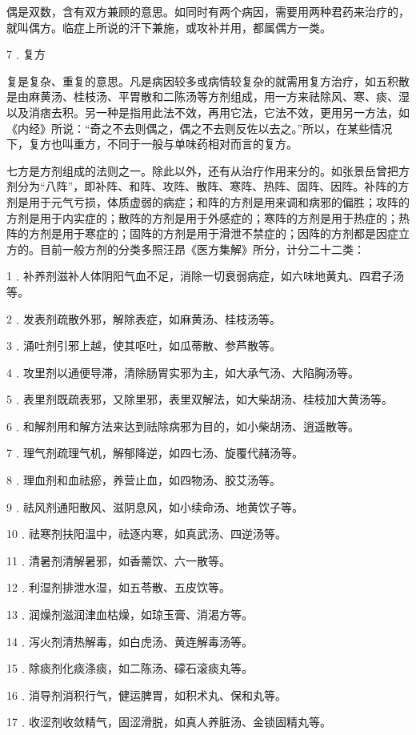 \documentclass[a4paper,12pt,UTF8,twoside]{ctexbook}
\begin{document}
偶是双数，含有双方兼顾的意思。如同时有两个病因，需要用两种君药来治疗的，就叫偶方。临症上所说的汗下兼施，或攻补并用，都属偶方一类。

7﹒复方

复是复杂、重复的意思。凡是病因较多或病情较复杂的就需用复方治疗，如五积散是由麻黄汤、桂枝汤、平胃散和二陈汤等方剂组成，用一方来祛除风、寒、痰、湿以及消痞去积。另一种是指用此法不效，再用它法，它法不效，更用另一方法，如《内经》所说：“奇之不去则偶之，偶之不去则反佐以去之。”所以，在某些情况下，复方也叫重方，不同于一般与单味药相对而言的复方。

七方是方剂组成的法则之一。除此以外，还有从治疗作用来分的。如张景岳曾把方剂分为“八阵”，即补阵、和阵、攻阵、散阵、寒阵、热阵、固阵、因阵。补阵的方剂是用于元气亏损，体质虚弱的病症；和阵的方剂是用来调和病邪的偏胜；攻阵的方剂是用于内实症的；散阵的方剂是用于外感症的；寒阵的方剂是用于热症的；热阵的方剂是用于寒症的；固阵的方剂是用于滑泄不禁症的；因阵的方剂都是因症立方的。目前一般方剂的分类多照汪昂《医方集解》所分，计分二十二类：

1﹒补养剂滋补人体阴阳气血不足，消除一切衰弱病症，如六味地黄丸、四君子汤等。

2﹒发表剂疏散外邪，解除表症，如麻黄汤、桂枝汤等。

3﹒涌吐剂引邪上越，使其呕吐，如瓜蒂散、参芦散等。

4﹒攻里剂以通便导滞，清除肠胃实邪为主，如大承气汤、大陷胸汤等。

5﹒表里剂既疏表邪，又除里邪，表里双解法，如大柴胡汤、桂枝加大黄汤等。

6﹒和解剂用和解方法来达到祛除病邪为目的，如小柴胡汤、逍遥散等。

7﹒理气剂疏理气机，解郁降逆，如四七汤、旋覆代赭汤等。

8﹒理血剂和血祛瘀，养营止血，如四物汤、胶艾汤等。

9﹒祛风剂通阳散风、滋阴息风，如小续命汤、地黄饮子等。

10﹒祛寒剂扶阳温中，祛逐内寒，如真武汤、四逆汤等。

11﹒清暑剂清解暑邪，如香薷饮、六一散等。

12﹒利湿剂排泄水湿，如五苓散、五皮饮等。

13﹒润燥剂滋润津血枯燥，如琼玉膏、消渴方等。

14﹒泻火剂清热解毒，如白虎汤、黄连解毒汤等。

15﹒除痰剂化痰涤痰，如二陈汤、礞石滚痰丸等。

16﹒消导剂消积行气，健运脾胃，如积术丸、保和丸等。

17﹒收涩剂收敛精气，固涩滑脱，如真人养脏汤、金锁固精丸等。
\end{document}
